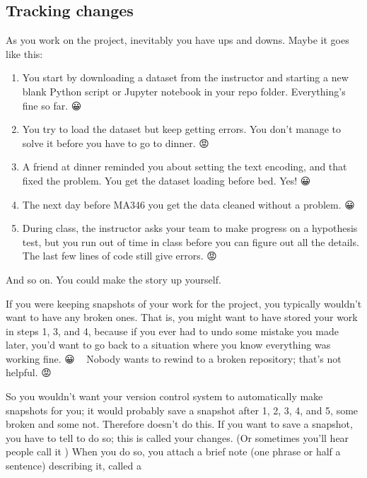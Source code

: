 \documentclass[letterpaper,10pt,english]{jupyterBook}
\begin{document}
\subsection{Tracking changes}
\label{\detokenize{chapter-8-version-control:tracking-changes}}
\sphinxAtStartPar
As you work on the project, inevitably you have ups and downs.  Maybe it goes like this:
\begin{enumerate}
%
\item {} 
\sphinxAtStartPar
You start by downloading a dataset from the instructor and starting a new blank Python script or Jupyter notebook in your repo folder.  Everything’s fine so far.  😀

\item {} 
\sphinxAtStartPar
You try to load the dataset but keep getting errors.  You don’t manage to solve it before you have to go to dinner.  😡

\item {} 
\sphinxAtStartPar
A friend at dinner reminded you about setting the text encoding, and that fixed the problem.  You get the dataset loading before bed.  Yes!  😀

\item {} 
\sphinxAtStartPar
The next day before MA346 you get the data cleaned without a problem.  😀

\item {} 
\sphinxAtStartPar
During class, the instructor asks your team to make progress on a hypothesis test, but you run out of time in class before you can figure out all the details.  The last few lines of code still give errors.  😡

\end{enumerate}

\sphinxAtStartPar
And so on.  You could make the story up yourself.

\sphinxAtStartPar
If you were keeping snapshots of your work for the project, you typically wouldn’t want to have any broken ones.  That is, you might want to have stored your work in steps 1, 3, and 4, because if you ever had to undo some mistake you made later, you’d want to go back to a situation where you know everything was working fine. 😀    Nobody wants to rewind to a broken repository; that’s not helpful. 😡

\sphinxAtStartPar
So you wouldn’t want your version control system to automatically make snapshots for you; it would probably save a snapshot after 1, 2, 3, 4, and 5, some broken and some not.  Therefore  doesn’t do this.  If you want to save a snapshot, you have to tell  to do so; this is called  your changes.  (Or sometimes you’ll hear people call it )  When you do so, you attach a brief note (one phrase or half a sentence) describing it, called a 
\end{document}
